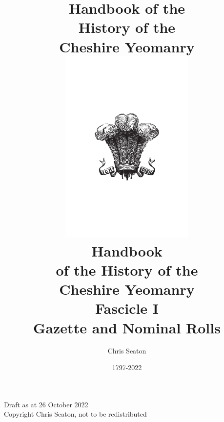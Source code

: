 \documentclass[a4paper,7pt]{book}
\title{Handbook of the \\ History of the \\ Cheshire Yeomanry}
\author{Chris Seaton}
\date{1797-2022}
\title{
  \includegraphics[width=0.5\textwidth]{front/feathers.pdf} \\
  \vspace{10mm}
  \huge Handbook \\
  \vspace{2mm}
  \Large of the History of the \\
  \Huge Cheshire Yeomanry \\
  \vspace{10mm}
  \Large Fascicle I \\ Gazette and Nominal Rolls
}
\begin{document}
\frontmatter

\maketitle

\vspace*{\fill}

\begin{center}
  Draft as at 26 October 2022
  \\ \vspace{10mm}
  Copyright  Chris Seaton, not to be redistributed
\end{center}

\setcounter{tocdepth}{0}
\tableofcontents{}

\mainmatter


% 
% 


%

\end{document}
